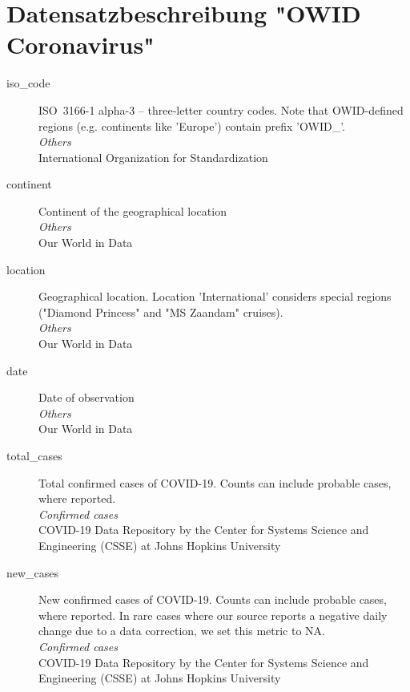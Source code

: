 \chapter{Datensatzbeschreibung "OWID Coronavirus"}
\label{app:OWID-API}

\begin{description}

    \item[iso\_code]
    ISO\ 3166-1 alpha-3 – three-letter country codes. Note that OWID-defined regions (e.g. continents like 'Europe') contain prefix 'OWID\_'.\\
    \emph{\footnotesize{Others}}\\
    \footnotesize{International Organization for Standardization}\\

    \item[continent] 
    Continent of the geographical location\\
    \emph{\footnotesize{Others}}\\
    Our World in Data\\

    \item[location] 
    Geographical location. Location 'International' considers special regions ("Diamond Princess" and "MS Zaandam" cruises).\\
    \emph{\footnotesize{Others}}\\
    Our World in Data\\

    \item[date] 
    Date of observation\\
    \emph{\footnotesize{Others}}\\
    Our World in Data\\

    \item[total\_cases] 
    Total confirmed cases of COVID-19. Counts can include probable cases, where reported.\\
    \emph{\footnotesize{Confirmed cases}}\\
    \footnotesize{COVID-19 Data Repository by the Center for Systems Science and Engineering (CSSE) at Johns Hopkins University}\\

    \item[new\_cases] 
    New confirmed cases of COVID-19. Counts can include probable cases, where reported. In rare cases where our source reports a negative daily change due to a data correction, we set this metric to NA.\\
    \emph{\footnotesize{Confirmed cases}}\\
    \footnotesize{COVID-19 Data Repository by the Center for Systems Science and Engineering (CSSE) at Johns Hopkins University}\\


\end{description}
